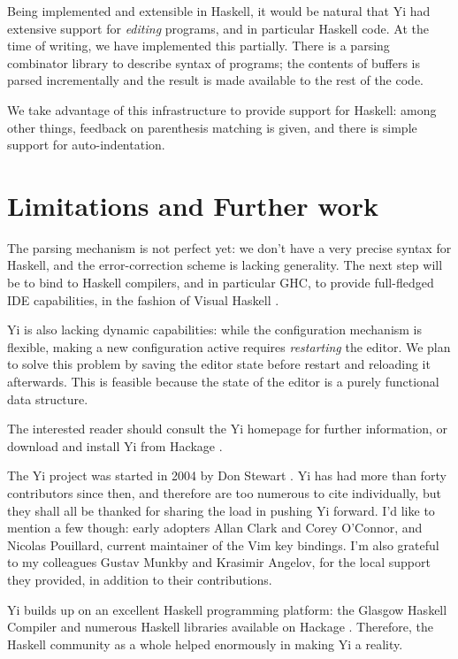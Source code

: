 \documentclass[9pt,indentedstyle,preprint]{sigplanconf}
\begin{document}
Being implemented and extensible in Haskell, it would be natural that
Yi had extensive support for \emph{editing} programs, and in
particular Haskell code.  At the time of writing, we have implemented
this partially. There is a parsing combinator library to describe
syntax of programs; the contents of buffers is parsed incrementally
and the result is made available to the rest of the code.

We take advantage of this infrastructure to provide support for
Haskell: among other things, feedback on parenthesis matching is
given, and there is simple support for auto-indentation.

\section{Limitations and Further work}

The parsing mechanism is not perfect yet: we don't have a very precise
syntax for Haskell, and the error-correction scheme is lacking
generality.  The next step will be to bind to Haskell compilers, and
in particular GHC, to provide full-fledged IDE capabilities, in the
fashion of Visual Haskell \cite{Angelov2005VH}.

Yi is also lacking dynamic capabilities: while the configuration
mechanism is flexible, making a new configuration active requires {\em
  restarting} the editor.  We plan to solve this problem by saving the
editor state before restart and reloading it afterwards. This is
feasible because the state of the editor is a purely functional data
structure.

The interested reader should consult the Yi homepage \cite{YiHome} for
further information, or download and install Yi from Hackage
\cite{Hackage}.

\acks 

The Yi project was started in 2004 by Don Stewart
\cite{Stewart2005Dynamic}. Yi has had more than forty contributors
since then, and therefore are too numerous to cite individually, but
they shall all be thanked for sharing the load in pushing Yi
forward. I'd like to mention a few though: early adopters Allan Clark
and Corey O'Connor, and Nicolas Pouillard, current maintainer of the
Vim key bindings. I'm also grateful to my colleagues Gustav Munkby and
Krasimir Angelov, for the local support they provided, in addition to
their contributions.

Yi builds up on an excellent Haskell programming platform: the Glasgow
Haskell Compiler and numerous Haskell libraries available on Hackage
\cite{Hackage}. Therefore, the Haskell community as a whole helped
enormously in making Yi a reality.



\end{document}
